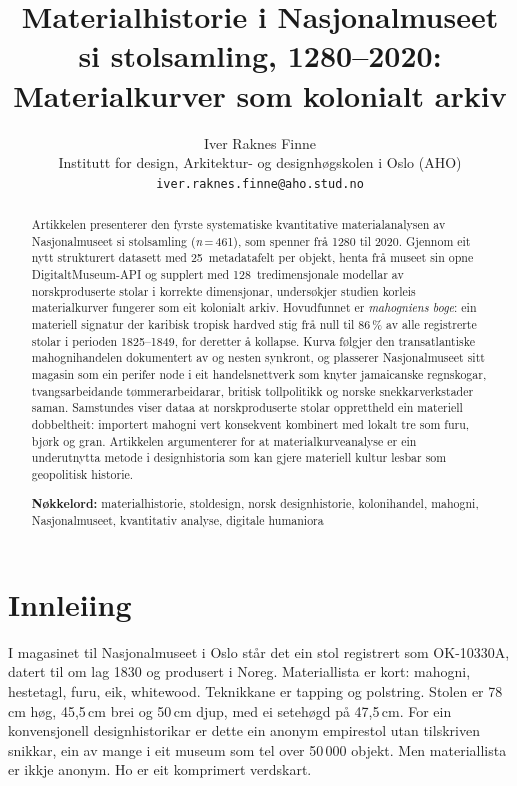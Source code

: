 \documentclass[12pt,a4paper]{article}
\title{Materialhistorie i Nasjonalmuseet si stolsamling, 1280--2020:\\
\large Materialkurver som kolonialt arkiv}
\author{Iver Raknes Finne\\
\small Institutt for design, Arkitektur- og designh\o{}gskolen i Oslo (AHO)\\
\small\texttt{iver.raknes.finne@aho.stud.no}}
\date{}
\begin{document}
\maketitle

\begin{abstract}
\noindent
Artikkelen presenterer den fyrste systematiske kvantitative materialanalysen av Nasjonalmuseet si stolsamling (\emph{n}\,=\,461), som spenner fr\aa{} 1280 til 2020. Gjennom eit nytt strukturert datasett med 25~metadatafelt per objekt, henta fr\aa{} museet sin opne DigitaltMuseum-API og supplert med 128~tredimensjonale modellar av norskproduserte stolar i korrekte dimensjonar, unders\o{}kjer studien korleis materialkurver fungerer som eit kolonialt arkiv. Hovudfunnet er \emph{mahogniens boge}: ein materiell signatur der karibisk tropisk hardved stig fr\aa{} null til 86\,\% av alle registrerte stolar i perioden 1825--1849, for deretter \aa{} kollapse. Kurva f\o{}lgjer den transatlantiske mahognihandelen dokumentert av \citet{anderson2012} og \citet{bowett2012} nesten synkront, og plasserer Nasjonalmuseet sitt magasin som ein perifer node i eit handelsnettverk som knyter jamaicanske regnskogar, tvangsarbeidande t\o{}mmerarbeidarar, britisk tollpolitikk og norske snekkarverkstader saman. Samstundes viser dataa at norskproduserte stolar opprettheld ein materiell dobbeltheit: importert mahogni vert konsekvent kombinert med lokalt tre som furu, bj\o{}rk og gran. Artikkelen argumenterer for at materialkurveanalyse er ein underutnytta metode i designhistoria som kan gjere materiell kultur lesbar som geopolitisk historie.

\medskip
\noindent\textbf{N\o{}kkelord:} materialhistorie, stoldesign, norsk designhistorie, kolonihandel, mahogni, Nasjonalmuseet, kvantitativ analyse, digitale humaniora
\end{abstract}

\section{Innleiing}

I magasinet til Nasjonalmuseet i Oslo st\aa{}r det ein stol registrert som OK-10330A, datert til om lag 1830 og produsert i Noreg. Materiallista er kort: mahogni, hestetagl, furu, eik, whitewood. Teknikkane er tapping og polstring. Stolen er 78\,cm h\o{}g, 45,5\,cm brei og 50\,cm djup, med ei seteh\o{}gd p\aa{} 47,5\,cm. For ein konvensjonell designhistorikar er dette ein anonym empirestol utan tilskriven snikkar, ein av mange i eit museum som tel over 50\,000 objekt. Men materiallista er ikkje anonym. Ho er eit komprimert verdskart.
\end{document}
